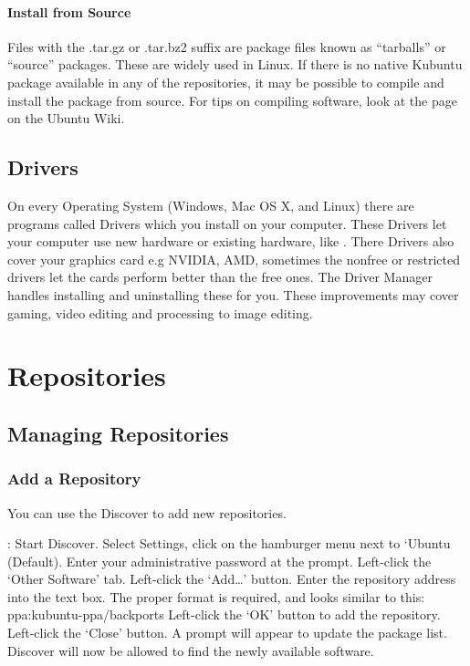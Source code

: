 \documentclass[letterpaper,10pt,english]{sphinxmanual}
\begin{document}
\subsubsection{Install from Source}
\label{\detokenize{docs/advanced:install-from-source}}
Files with the .tar.gz or .tar.bz2 suffix are package files known as “tarballs” or “source” packages. These are widely used in Linux. If there is no native Kubuntu package available in any of the repositories, it may be possible to compile and install the package from source. For tips on compiling software, look at the  page on the Ubuntu Wiki.


\section{Drivers}
\label{\detokenize{docs/advanced:drivers}}
On every Operating System (Windows, Mac OS X, and Linux) there are programs called Drivers which you install on your computer. These Drivers let your computer use new hardware or existing hardware, like . There Drivers also cover your graphics card e.g NVIDIA, AMD, sometimes the nonfree or restricted drivers let the cards perform better than the free ones. The Driver Manager handles installing and uninstalling these for you. These improvements may cover gaming, video editing and processing to image editing.


\chapter{Repositories}
\label{\detokenize{docs/repositories:repositories}}\label{\detokenize{docs/repositories:repositories-link}}\label{\detokenize{docs/repositories::doc}}

\section{Managing Repositories}
\label{\detokenize{docs/repositories:managing-repositories}}

\subsection{Add a Repository}
\label{\detokenize{docs/repositories:add-a-repository}}
You can use the Discover to add new repositories.

: Start Discover. Select Settings, click on the hamburger menu next to ‘Ubuntu (Default). Enter your administrative password at the prompt. Left-click the ‘Other Software’ tab. Left-click the ‘Add…’ button. Enter the repository address into the text box. The proper format is required, and looks similar to this: ppa:kubuntu-ppa/backports Left-click the ‘OK’ button to add the repository. Left-click the ‘Close’ button. A prompt will appear to update the package list. Discover will now be allowed to find the newly available software.
\end{document}
